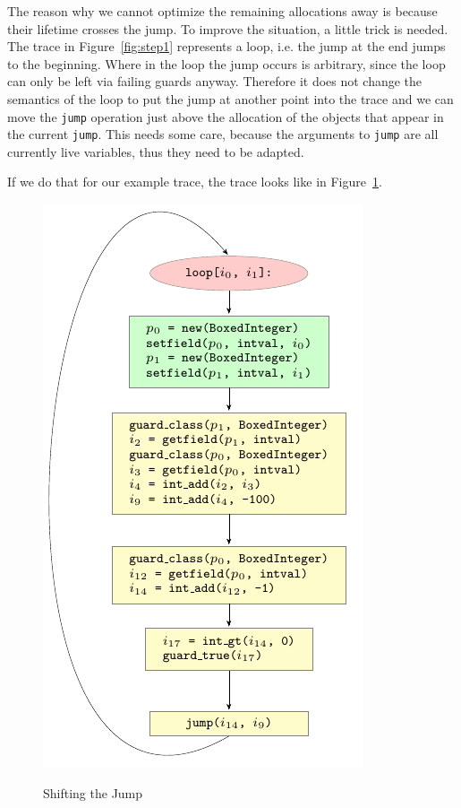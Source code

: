 \documentclass{sigplanconf}
\begin{document}
The reason why we cannot optimize the remaining allocations away is because
their lifetime crosses the jump. To improve the situation, a little trick is
needed. The trace in Figure~\ref{fig:step1} represents a loop, i.e. the jump at the end jumps to
the beginning. Where in the loop the jump occurs is arbitrary, since the loop
can only be left via failing guards anyway. Therefore it does not change the
semantics of the loop to put the jump at another point into the trace and we
can move the \texttt{jump} operation just above the allocation of the objects that
appear in the current \texttt{jump}. This needs some care, because the arguments to
\texttt{jump} are all currently live variables, thus they need to be adapted.

If we do that for our example trace, the trace looks like in Figure~\ref{fig:step2}.

\begin{figure}
\includegraphics{figures/step2.pdf}
\label{fig:step2}
\caption{Shifting the Jump}
\end{figure}
\end{document}

